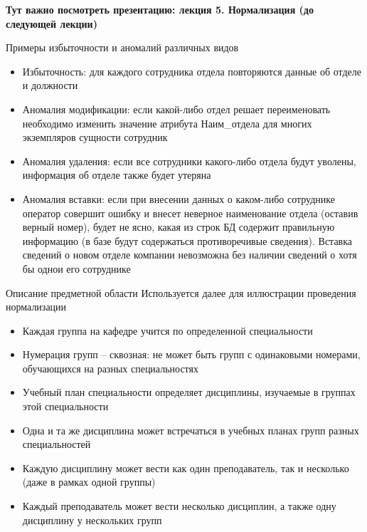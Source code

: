 \documentclass[12pt]{article}
\begin{document}
\textbf{Тут важно посмотреть презентацию: лекция 5. Нормализация (до следующей лекции)}

\begin{Example}{Примеры избыточности и аномалий различных видов}
    \begin{itemize}
        \item Избыточность: для каждого сотрудника отдела повторяются данные об отделе и должности 
        \item Аномалия модификации: если какой-либо отдел решает переименовать необходимо изменить значение атрибута Наим\_отдела для многих экземпляров сущности сотрудник 
        \item Аномалия удаления: если все сотрудники какого-либо отдела будут уволены, информация об отделе также будет утеряна 
        \item Аномалия вставки: если при внесении данных о каком-либо сотруднике оператор совершит ошибку и внесет неверное наименование отдела (оставив верный номер), будет не ясно, какая из строк БД содержит правильную информацию (в базе будут содержаться противоречивые сведения). Вставка сведений о новом отделе компании невозможна без наличии сведений о хотя бы однои его сотруднике
    \end{itemize}
\end{Example}

\begin{nota}{Описание предметной области}
    Используется далее для иллюстрации проведения нормализации 

    \begin{itemize}
        \item Каждая группа на кафедре учится по определенной специальности 
        \item Нумерация групп -- сквозная: не может быть групп с одинаковыми номерами, обучающихся на разных специальностях 
        \item Учебный план специальности определяет дисциплины, изучаемые в группах этой специальности 
        \item Одна и та же дисциплина может встречаться в учебных планах групп разных специальностей 
        \item Каждую дисциплину может вести как один преподаватель, так и несколько (даже в рамках одной группы)
        \item Каждый преподаватель может вести несколько дисциплин, а также одну дисциплину у нескольких групп
    \end{itemize}
\end{nota}
\end{document}
